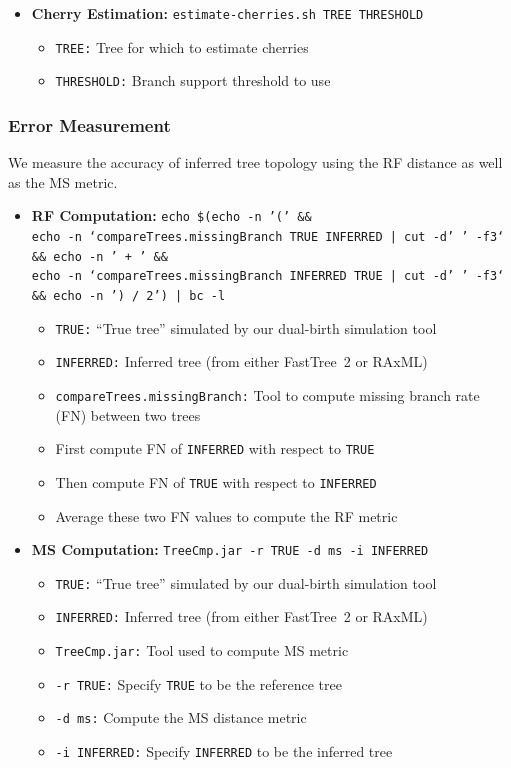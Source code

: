 \begin{itemize}
\item \textbf{Cherry Estimation:} \texttt{estimate-cherries.sh TREE THRESHOLD}
\begin{itemize}
\item \texttt{TREE:} Tree for which to estimate cherries
\item \texttt{THRESHOLD:} Branch support threshold to use
\end{itemize}
\end{itemize}

\subsubsection{Error Measurement}
We measure the accuracy of inferred tree topology using the \gls{RF} distance as well as the \gls{MS} metric.

\begin{itemize}
\item \textbf{RF Computation:} \texttt{echo \$(echo -n '(' \&\&\\echo -n `compareTrees.missingBranch TRUE INFERRED | cut -d' ' -f3` \&\&\\echo -n ' + ' \&\&\\echo -n `compareTrees.missingBranch INFERRED TRUE | cut -d' ' -f3` \&\&\\echo -n ') / 2') | bc -l}
\begin{itemize}
\item \texttt{TRUE:} ``True tree'' simulated by our dual-birth simulation tool
\item \texttt{INFERRED:} Inferred tree (from either FastTree~2 or RAxML)
\item \texttt{compareTrees.missingBranch:} Tool to compute missing branch rate (FN) between two trees
\item First compute FN of \texttt{INFERRED} with respect to \texttt{TRUE}
\item Then compute FN of \texttt{TRUE} with respect to \texttt{INFERRED}
\item Average these two FN values to compute the RF metric
\end{itemize}

\item \textbf{\gls{MS} Computation:} \texttt{TreeCmp.jar -r TRUE -d ms -i INFERRED}
\begin{itemize}
\item \texttt{TRUE:} ``True tree'' simulated by our dual-birth simulation tool
\item \texttt{INFERRED:} Inferred tree (from either FastTree~2 or RAxML)
\item \texttt{TreeCmp.jar:} Tool used to compute MS metric~\cite{Bogdanowicz2012}
\item \texttt{-r TRUE:} Specify \texttt{TRUE} to be the reference tree
\item \texttt{-d ms:} Compute the MS distance metric
\item \texttt{-i INFERRED:} Specify \texttt{INFERRED} to be the inferred tree
\end{itemize}
\end{itemize}

